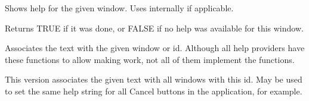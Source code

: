 
Shows help for the given window. Uses  internally if
applicable.

Returns TRUE if it was done, or FALSE if no help was available
for this window.

\label{wxhelpprovideraddhelp}


Associates the text with the given window or id. Although all help
providers have these functions to allow making  
work, not all of them implement the functions.


This version associates the given text with all windows with this id.
May be used to set the same help string for all Cancel buttons in
the application, for example.

